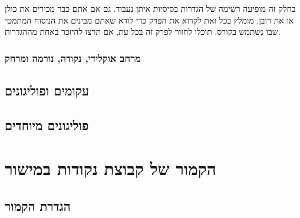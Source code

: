 \documentclass[
]{book}
\theoremstyle{definition}
\theoremstyle{definition}
\theoremstyle{definition}
\theoremstyle{definition}
\theoremstyle{remark}
\begin{document}
בחלק זה מופיעה רשימה של הגדרות בסיסיות איתן נעבוד. גם אם אתם כבר מכירים את כולן או את רובן, מומלץ בכל זאת לקרוא את הפרק כדי לודא שאתם מבינים את הניסוח המתמטי שבו נשתמש בקורס. תוכלו לחזור לפרק זה בכל עת, אם תרצו להיזכר באחת מההגדרות.

\hypertarget{ux5deux5e8ux5d7ux5d1-ux5d0ux5d5ux5e7ux5dcux5d9ux5d3ux5d9-ux5e0ux5e7ux5d5ux5d3ux5d4-ux5e0ux5d5ux5e8ux5deux5d4-ux5d5ux5deux5e8ux5d7ux5e7}{%
\subsubsection*{\texorpdfstring{\textbf{מרחב אוקלידי, נקודה, נורמה ומרחק}}{מרחב אוקלידי, נקודה, נורמה ומרחק}}\label{ux5deux5e8ux5d7ux5d1-ux5d0ux5d5ux5e7ux5dcux5d9ux5d3ux5d9-ux5e0ux5e7ux5d5ux5d3ux5d4-ux5e0ux5d5ux5e8ux5deux5d4-ux5d5ux5deux5e8ux5d7ux5e7}}

\hypertarget{ux5e2ux5e7ux5d5ux5deux5d9ux5dd-ux5d5ux5e4ux5d5ux5dcux5d9ux5d2ux5d5ux5e0ux5d9ux5dd}{%
\subsection*{\texorpdfstring{\textbf{עקומים ופוליגונים}}{עקומים ופוליגונים}}\label{ux5e2ux5e7ux5d5ux5deux5d9ux5dd-ux5d5ux5e4ux5d5ux5dcux5d9ux5d2ux5d5ux5e0ux5d9ux5dd}}

\hypertarget{ux5e4ux5d5ux5dcux5d9ux5d2ux5d5ux5e0ux5d9ux5dd-ux5deux5d9ux5d5ux5d7ux5d3ux5d9ux5dd}{%
\subsection*{\texorpdfstring{\textbf{פוליגונים מיוחדים}}{פוליגונים מיוחדים}}\label{ux5e4ux5d5ux5dcux5d9ux5d2ux5d5ux5e0ux5d9ux5dd-ux5deux5d9ux5d5ux5d7ux5d3ux5d9ux5dd}}

\hypertarget{ux5d4ux5e7ux5deux5d5ux5e8-ux5e9ux5dc-ux5e7ux5d1ux5d5ux5e6ux5ea-ux5e0ux5e7ux5d5ux5d3ux5d5ux5ea-ux5d1ux5deux5d9ux5e9ux5d5ux5e8}{%
\section{הקמור של קבוצת נקודות במישור}\label{ux5d4ux5e7ux5deux5d5ux5e8-ux5e9ux5dc-ux5e7ux5d1ux5d5ux5e6ux5ea-ux5e0ux5e7ux5d5ux5d3ux5d5ux5ea-ux5d1ux5deux5d9ux5e9ux5d5ux5e8}}

\hypertarget{ux5d4ux5d2ux5d3ux5e8ux5ea-ux5d4ux5e7ux5deux5d5ux5e8}{%
\subsection{\texorpdfstring{\textbf{הגדרת הקמור}}{הגדרת הקמור}}\label{ux5d4ux5d2ux5d3ux5e8ux5ea-ux5d4ux5e7ux5deux5d5ux5e8}}
\end{document}
